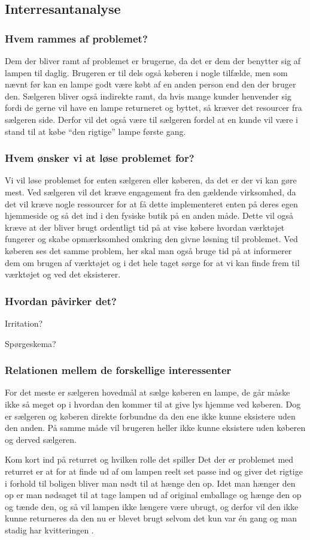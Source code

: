 \subsection{Interresantanalyse}
\subsubsection{Hvem rammes af problemet?}
Dem der bliver ramt af problemet er brugerne, da det er dem der benytter sig af lampen til daglig. Brugeren er til dels også køberen i nogle tilfælde, men som nævnt før kan en lampe godt være købt af en anden person end den der bruger den.
Sælgeren bliver også indirekte ramt, da hvis mange kunder henvender sig fordi de gerne vil have en lampe returneret og byttet, så kræver det resourcer fra sælgeren side. Derfor vil det også være til sælgeren fordel at en kunde vil være i stand til at købe “den rigtige” lampe første gang.
 
\subsubsection{Hvem ønsker vi at løse problemet for?}
Vi vil løse problemet for enten sælgeren eller køberen, da det er der vi kan gøre mest. Ved sælgeren vil det kræve engagement fra den gældende virksomhed, da det vil kræve nogle ressourcer for at få dette implementeret enten på deres egen hjemmeside og så det ind i den fysiske butik på en anden måde. Dette vil også kræve at der bliver brugt ordentligt tid på at vise købere hvordan værktøjet fungerer og skabe opmærksomhed omkring den givne løsning til problemet.
Ved køberen ses det samme problem, her skal man også bruge tid på at informerer dem om brugen af værktøjet og i det hele taget sørge for at vi kan finde frem til værktøjet og ved det eksisterer.
 
\subsubsection{Hvordan påvirker det?}

Irritation?
 
Spørgeskema?
 
\subsubsection{Relationen mellem de forskellige interessenter}
For det meste er sælgeren hovedmål at sælge køberen en lampe, de går måske ikke så meget op i hvordan den kommer til at give lys hjemme ved køberen. Dog er sælgeren og køberen direkte forbundne da den ene ikke kunne eksistere uden den anden.  På samme måde vil brugeren heller ikke kunne eksistere uden køberen og derved sælgeren.
 
Kom kort ind på returret og hvilken rolle det spiller
Det der er problemet med returret er at for at finde ud af om lampen reelt set passe ind og giver det rigtige i forhold til boligen bliver man nødt til at hænge den op. Idet man hænger den op er man nødsaget til at tage lampen ud af original emballage og hænge den op og tænde den, og så vil lampen ikke længere være ubrugt, og derfor vil den ikke kunne returneres da den nu er blevet brugt selvom det kun var én gang og man stadig har kvitteringen \cite{ikea_returret}.

